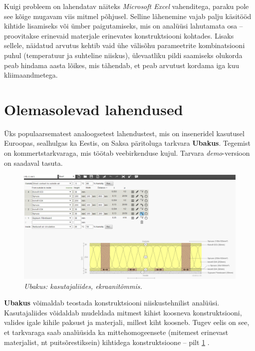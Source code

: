 Kuigi probleem on lahendatav näiteks \textit{Microsoft Excel} vahenditega, paraku pole see kõige mugavam viis
mitmel põhjusel. Selline lähenemine vajab palju käsitööd kihtide lisamiseks või ümber paigutamiseks, mis on analüüsi lahutamata
osa -- proovitakse erinevaid materjale erinevates konstruktsiooni kohtades. Lisaks sellele, näidatud arvutus kehtib vaid ühe 
välisõhu parameetrite kombinatsiooni puhul (temperatuur ja suhteline niiskus), ülevaatliku pildi saamiseks olukorda peab hindama
 aasta lõikes, mis tähendab, et  peab arvutust kordama iga kuu kliimaandmetega.

\section{Olemasolevad lahendused}
\label{chapters:problem_statement_existing_solutions}
Üks populaarsematest analoogsetest lahendustest, mis on inseneridel kasutusel Euroopas, sealhulgas ka Eestis, on Saksa päritoluga tarkvara \textbf{Ubakus}. 
Tegemist on kommertstarkvaraga, mis töötab veebirkenduse kujul. Tarvara \textit{demo}-versioon on saadaval tasuta.
\begin{figure}[ht]
    \centering
    \includegraphics[width=1\textwidth]{figures/problem_statement/01_ubakus.png}
    \caption[Ubakus tarkvara katutajaliides, ekraanitõmmis]{\textit{Ubakus: kasutajaliides, ekraanitõmmis.}}
    \label{fig:ubakus_sample}
\end{figure}

\textbf{Ubakus} võimaldab teostada konstruktsiooni niiskustehnilist analüüsi. Kasutajaliides võidaldab 
mudeldada mitmest kihist koosneva konstruktsiooni, valides igale kihile paksust ja materjali, millest 
kiht koosneb. Tugev eelis on see, et tarkvaraga saab analüüsida ka mittehomogeensete (mitemest erinevast 
materjalist, nt puitsõrestiksein) kihtidega konstruktsioone -- pilt \ref{fig:ubakus_sample} \cite{ubakus}.


